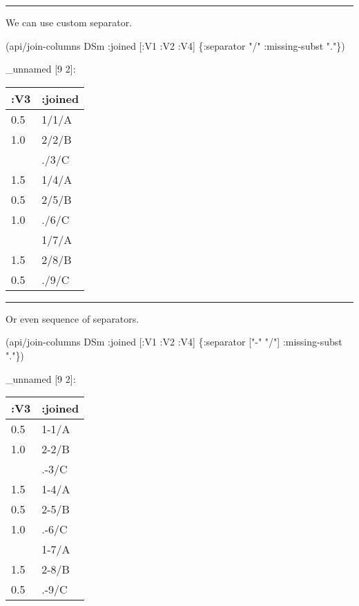 \documentclass[]{article}
\newenvironment{Shaded}{\begin{snugshade}}{\end{snugshade}}
\newcommand{\AttributeTok}[1]{\textcolor[rgb]{0.77,0.63,0.00}{#1}}
\newcommand{\NormalTok}[1]{#1}
\newcommand{\StringTok}[1]{\textcolor[rgb]{0.31,0.60,0.02}{#1}}
\begin{document}
\begin{center}\rule{0.5\linewidth}{0.5pt}\end{center}

We can use custom separator.

\begin{Shaded}
\begin{Highlighting}[]
\NormalTok{(api/join-columns DSm }\AttributeTok{:joined}\NormalTok{ [}\AttributeTok{:V1} \AttributeTok{:V2} \AttributeTok{:V4}\NormalTok{] \{}\AttributeTok{:separator} \StringTok{"/"}
                                             \AttributeTok{:missing-subst} \StringTok{"."}\NormalTok{\})}
\end{Highlighting}
\end{Shaded}

\_unnamed {[}9 2{]}:

\begin{longtable}[]{@{}ll@{}}
\toprule
:V3 & :joined\tabularnewline
\midrule
\endhead
0.5 & 1/1/A\tabularnewline
1.0 & 2/2/B\tabularnewline
& ./3/C\tabularnewline
1.5 & 1/4/A\tabularnewline
0.5 & 2/5/B\tabularnewline
1.0 & ./6/C\tabularnewline
& 1/7/A\tabularnewline
1.5 & 2/8/B\tabularnewline
0.5 & ./9/C\tabularnewline
\bottomrule
\end{longtable}

\begin{center}\rule{0.5\linewidth}{0.5pt}\end{center}

Or even sequence of separators.

\begin{Shaded}
\begin{Highlighting}[]
\NormalTok{(api/join-columns DSm }\AttributeTok{:joined}\NormalTok{ [}\AttributeTok{:V1} \AttributeTok{:V2} \AttributeTok{:V4}\NormalTok{] \{}\AttributeTok{:separator}\NormalTok{ [}\StringTok{"-"} \StringTok{"/"}\NormalTok{]}
                                             \AttributeTok{:missing-subst} \StringTok{"."}\NormalTok{\})}
\end{Highlighting}
\end{Shaded}

\_unnamed {[}9 2{]}:

\begin{longtable}[]{@{}ll@{}}
\toprule
:V3 & :joined\tabularnewline
\midrule
\endhead
0.5 & 1-1/A\tabularnewline
1.0 & 2-2/B\tabularnewline
& .-3/C\tabularnewline
1.5 & 1-4/A\tabularnewline
0.5 & 2-5/B\tabularnewline
1.0 & .-6/C\tabularnewline
& 1-7/A\tabularnewline
1.5 & 2-8/B\tabularnewline
0.5 & .-9/C\tabularnewline
\bottomrule
\end{longtable}
\end{document}

